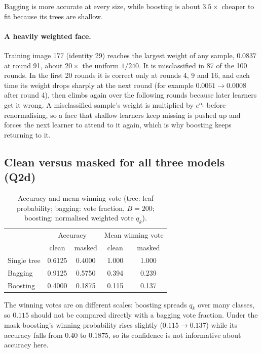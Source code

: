 \documentclass[10pt,twocolumn,letterpaper]{article}
\begin{document}
Bagging is more accurate at every size, while boosting is about $3.5\times$ cheaper to fit because its trees are shallow.

\paragraph{A heavily weighted face.}
Training image 177 (identity 29) reaches the largest weight of any sample, $0.0837$ at round 91, about $20\times$ the uniform $1/240$.
It is misclassified in 87 of the 100 rounds. In the first 20 rounds it is correct only at rounds 4, 9 and 16, and each time its weight
drops sharply at the next round (for example $0.0061\to0.0008$ after round 4), then climbs again over the following rounds because
later learners get it wrong. A misclassified sample's weight is multiplied by $e^{\alpha_t}$ before renormalising, so a face that shallow learners
keep missing is pushed up and forces the next learner to attend to it again, which is why boosting keeps returning to it.

\subsection{Clean versus masked for all three models (Q2d)}
\begin{table}[htbp]
\centering
\caption{Accuracy and mean winning vote (tree: leaf probability; bagging: vote fraction, $B=200$; boosting: normalised weighted vote $q_k$).}
\label{tab:q2d}
\small
\setlength{\tabcolsep}{6pt}
\begin{tabular}{lcccc}
\toprule
 & \multicolumn{2}{c}{Accuracy} & \multicolumn{2}{c}{Mean winning vote}\\
 & clean & masked & clean & masked\\
\midrule
Single tree & 0.6125 & 0.4000 & 1.000 & 1.000 \\
Bagging     & 0.9125 & 0.5750 & 0.394 & 0.239 \\
Boosting    & 0.4000 & 0.1875 & 0.115 & 0.137 \\
\bottomrule
\end{tabular}
\end{table}

The winning votes are on different scales: boosting spreads $q_k$ over many classes, so $0.115$ should not be compared directly with a bagging vote fraction.
Under the mask boosting's winning probability rises slightly ($0.115\to0.137$) while its accuracy falls from $0.40$ to $0.1875$,
so its confidence is not informative about accuracy here.
\end{document}
